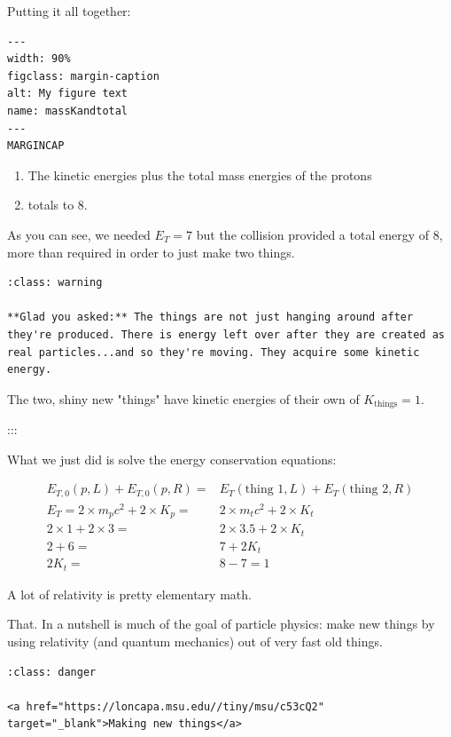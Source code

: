 \documentclass[
]{article}
\begin{document}
Putting it all together:

\begin{verbatim}
---
width: 90%
figclass: margin-caption
alt: My figure text
name: massKandtotal
---
MARGINCAP
\end{verbatim}

\begin{enumerate}
\def\labelenumi{\arabic{enumi}.}
\item
  The kinetic energies plus the total mass energies of the protons
\item
  totals to 8.
\end{enumerate}

As you can see, we needed \(E_T = 7\) but the collision provided a total
energy of \(8\), more than required in order to just make two things.

\begin{verbatim}
:class: warning

**Glad you asked:** The things are not just hanging around after they're produced. There is energy left over after they are created as real particles...and so they're moving. They acquire some kinetic energy.
\end{verbatim}

The two, shiny new "things" have kinetic energies of their own of
\(K_\text{things} = 1\).

:::

What we just did is solve the energy conservation equations:

\begin{align*}
E_{T,0}(p, L) + E_{T,0}(p, R) =& E_{T}(\text{thing 1}, L) + E_{T}(\text{thing 2}, R) \\
E_T = 2 \times m_pc^2 + 2 \times K_p =& 2 \times m_tc^2 + 2 \times K_t \\
2 \times 1 + 2 \times 3 =& 2 \times 3.5 + 2 \times K_t \\
2 + 6 =& 7 + 2K_t \\
2K_t =& 8-7 = 1
\end{align*}

A lot of relativity is pretty elementary math.

That. In a nutshell is much of the goal of particle physics: make new
things by using relativity (and quantum mechanics) out of very fast old
things.

\begin{verbatim}
:class: danger

<a href="https://loncapa.msu.edu//tiny/msu/c53cQ2"  target="_blank">Making new things</a>
\end{verbatim}
\end{document}
